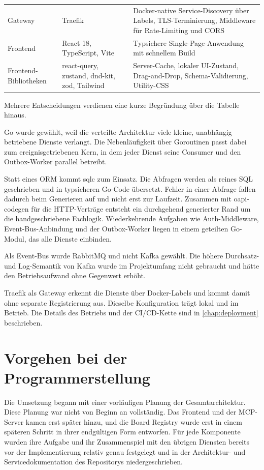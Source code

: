 \begin{table}[ht]
\begin{tabularx}{\linewidth}{@{}l>{\raggedright\arraybackslash}p{3.4cm}X@{}}
    Gateway             & Traefik            & Docker-native Service-Discovery über Labels, TLS-Terminierung, Middleware für Rate-Limiting und CORS \\
    Frontend            & React 18, TypeScript, Vite & Typsichere Single-Page-Anwendung mit schnellem Build \\
    Frontend-Bibliotheken & react-query, zustand, dnd-kit, zod, Tailwind & Server-Cache, lokaler UI-Zustand, Drag-and-Drop, Schema-Validierung, Utility-CSS \\
    \bottomrule
  \end{tabularx}
\end{table}

Mehrere Entscheidungen verdienen eine kurze Begründung über die Tabelle hinaus.

Go wurde gewählt, weil die verteilte Architektur viele kleine, unabhängig betriebene Dienste verlangt. Die Nebenläufigkeit über Goroutinen passt dabei zum ereignisgetriebenen Kern, in dem jeder Dienst seine Consumer und den Outbox-Worker parallel betreibt.

Statt eines ORM kommt sqlc zum Einsatz. Die Abfragen werden als reines SQL geschrieben und in typsicheren Go-Code übersetzt. Fehler in einer Abfrage fallen dadurch beim Generieren auf und nicht erst zur Laufzeit. Zusammen mit oapi-codegen für die HTTP-Verträge entsteht ein durchgehend generierter Rand um die handgeschriebene Fachlogik. Wiederkehrende Aufgaben wie Auth-Middleware, Event-Bus-Anbindung und der Outbox-Worker liegen in einem geteilten Go-Modul, das alle Dienste einbinden.

Als Event-Bus wurde RabbitMQ und nicht Kafka gewählt. Die höhere Durchsatz- und Log-Semantik von Kafka wurde im Projektumfang nicht gebraucht und hätte den Betriebsaufwand ohne Gegenwert erhöht.

Traefik als Gateway erkennt die Dienste über Docker-Labels und kommt damit ohne separate Registrierung aus. Dieselbe Konfiguration trägt lokal und im Betrieb. Die Details des Betriebs und der CI/CD-Kette sind in \vref{chap:deployment} beschrieben.

\section{Vorgehen bei der Programmerstellung}
\label{sec:vorgehen}

Die Umsetzung begann mit einer vorläufigen Planung der Gesamtarchitektur. Diese Planung war nicht von Beginn an vollständig. Das Frontend und der MCP-Server kamen erst später hinzu, und die Board Registry wurde erst in einem späteren Schritt in ihrer endgültigen Form entworfen. Für jede Komponente wurden ihre Aufgabe und ihr Zusammenspiel mit den übrigen Diensten bereits vor der Implementierung relativ genau festgelegt und in der Architektur- und Servicedokumentation des Repositorys niedergeschrieben.

